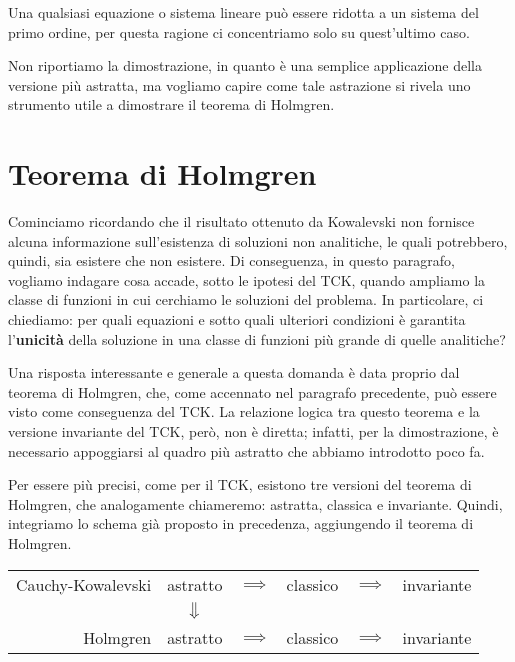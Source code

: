 \begin{remark}
Una qualsiasi equazione o sistema lineare può essere ridotta a un sistema del primo ordine, per questa ragione ci concentriamo solo su quest'ultimo caso.
\end{remark}

Non riportiamo la dimostrazione, in quanto è una semplice applicazione della versione più astratta, ma vogliamo capire come tale astrazione si rivela uno strumento utile a dimostrare il teorema di Holmgren.







\newpage
\section{Teorema di Holmgren}
Cominciamo ricordando che il risultato ottenuto da Kowalevski non fornisce alcuna informazione sull'esistenza di soluzioni non analitiche, le quali potrebbero, quindi, sia esistere che non esistere.
Di conseguenza, in questo paragrafo, vogliamo indagare cosa accade, sotto le ipotesi del TCK, quando ampliamo la classe di funzioni in cui cerchiamo le soluzioni del problema. 
In particolare, ci chiediamo: per quali equazioni e sotto quali ulteriori condizioni è garantita l'\textbf{unicità} della soluzione in una classe di funzioni più grande di quelle analitiche?

Una risposta interessante e generale a questa domanda è data proprio dal teorema di Holmgren, che, come accennato nel paragrafo precedente, può essere visto come conseguenza del TCK. 
La relazione logica tra questo teorema e la versione invariante del TCK, però, non è diretta; infatti, per la dimostrazione, è necessario appoggiarsi al quadro più astratto che abbiamo introdotto poco fa.

Per essere più precisi, come per il TCK, esistono tre versioni del teorema di Holmgren, che analogamente chiameremo: astratta, classica e invariante.
Quindi, integriamo lo schema già proposto in precedenza, aggiungendo il teorema di Holmgren.

\begin{center}
\renewcommand{\arraystretch}{1.5}
\begin{tabular}{r||ccccc} 
Cauchy-Kowalevski & astratto & $\implies$  & classico & $\implies$ & invariante\\
&$\big\Downarrow$ &&&&\\
Holmgren & astratto & $\implies$ & classico & $\implies$ & invariante\\
\end{tabular}
\end{center}


